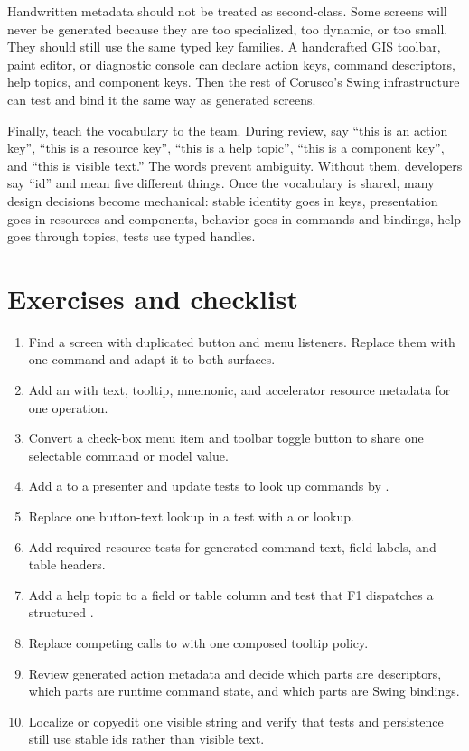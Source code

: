 Handwritten metadata should not be treated as second-class. Some screens will
never be generated because they are too specialized, too dynamic, or too small.
They should still use the same typed key families. A handcrafted GIS toolbar,
paint editor, or diagnostic console can declare action keys, command
descriptors, help topics, and component keys. Then the rest of Corusco's Swing
infrastructure can test and bind it the same way as generated screens.

Finally, teach the vocabulary to the team. During review, say ``this is an
action key'', ``this is a resource key'', ``this is a help topic'', ``this is
a component key'', and ``this is visible text.'' The words prevent ambiguity.
Without them, developers say ``id'' and mean five different things. Once the
vocabulary is shared, many design decisions become mechanical: stable identity
goes in keys, presentation goes in resources and components, behavior goes in
commands and bindings, help goes through topics, tests use typed handles.

\section{Exercises and checklist}

\begin{exercisebox}
\begin{enumerate}
\item Find a screen with duplicated button and menu listeners. Replace them
with one command and adapt it to both surfaces.
\item Add an  with text, tooltip, mnemonic, and
accelerator resource metadata for one operation.
\item Convert a check-box menu item and toolbar toggle button to share one
selectable command or model value.
\item Add a  to a presenter and update tests to look up
commands by .
\item Replace one button-text lookup in a test with a  or
 lookup.
\item Add required resource tests for generated command text, field labels, and
table headers.
\item Add a help topic to a field or table column and test that F1 dispatches a
structured .
\item Replace competing calls to  with one composed
tooltip policy.
\item Review generated action metadata and decide which parts are descriptors,
which parts are runtime command state, and which parts are Swing bindings.
\item Localize or copyedit one visible string and verify that tests and
persistence still use stable ids rather than visible text.
\end{enumerate}
\end{exercisebox}

